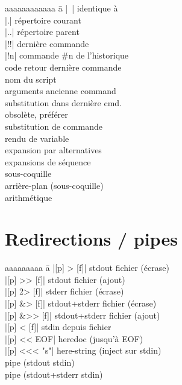 \documentclass[9pt]{extarticle}
\begin{document}
\begin{multicols}{4}
    \begin{tabbing}
        aaaaaaaaaaaa \= a \kill
        \code|~| \> identique à  \\
        \code|.| \> répertoire courant \\
        \code|..| \> répertoire parent \\
        \code|!!| \> dernière commande \\
        \code|!n| \> commande \#n de l'historique \\
         \> code retour dernière commande \\
         \> nom du script \\
        \code{!*} \> arguments ancienne command \\
         \> substitution dans dernière cmd. \\
         \> obsolète, préférer  \\
         \> substitution de commande \\
         \> rendu de variable \\
         \> expansion par alternatives \\
         \> expansions de séquence \\
         \> sous-coquille \\
         \> arrière-plan (sous-coquille) \\
         \> arithmétique \\
    \end{tabbing}

    \section*{Redirections / pipes}
    \begin{tabbing}
        aaaaaaaaa \= a \kill
        \code|[p] > [f]| \> stdout \textrightarrow{} fichier (écrase) \\
        \code|[p] >> [f]| \> stdout \textrightarrow{} fichier (ajout) \\
        \code|[p] 2> [f]| \> stderr \textrightarrow{} fichier (écrase) \\
        \code|[p] &> [f]| \> stdout+stderr \textrightarrow{} fichier (écrase) \\
        \code|[p] &>> [f]| \> stdout+stderr \textrightarrow{} fichier (ajout) \\
        \code|[p] < [f]| \> stdin depuis fichier \\
        \code|[p] << EOF| \> heredoc (jusqu'à EOF) \\
        \code|[p] <<< "s"| \> here-string (inject sur stdin) \\
        \code{[p] | [p]} \> pipe (stdout \textrightarrow{} stdin) \\
        \code{[p] |& [p]} \> pipe (stdout+stderr \textrightarrow{} stdin) \\
    \end{tabbing}


\end{multicols}
\end{document}
